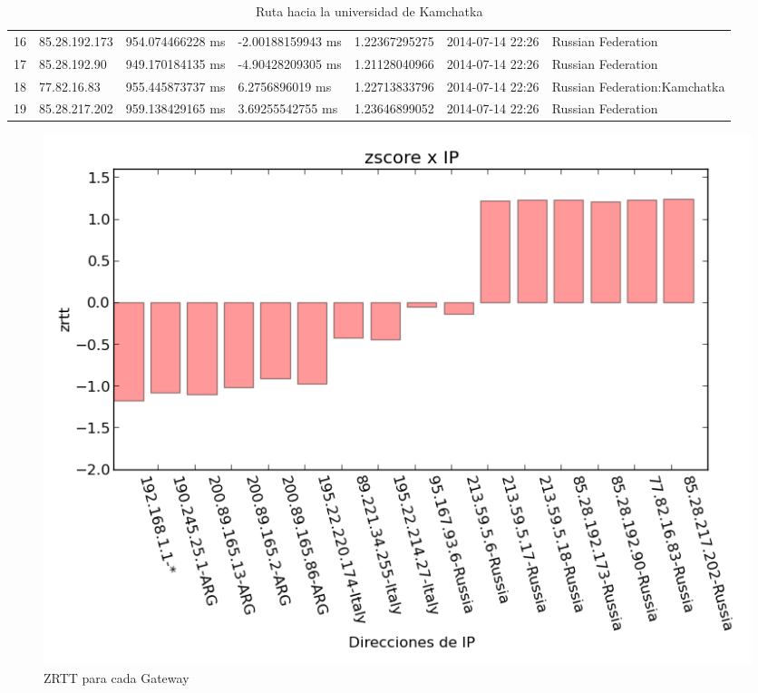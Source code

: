 \begin{table}[H]
{\begin{tabular}{lllllll}
16  & 85.28.192.173  & 954.074466228 ms & -2.00188159943 ms & 1.22367295275    & 2014-07-14 22:26 & Russian Federation           \\
17  & 85.28.192.90   & 949.170184135 ms & -4.90428209305 ms & 1.21128040966    & 2014-07-14 22:26 & Russian Federation           \\
18  & 77.82.16.83    & 955.445873737 ms & 6.2756896019 ms   & 1.22713833796    & 2014-07-14 22:26 & Russian Federation:Kamchatka \\
19  & 85.28.217.202  & 959.138429165 ms & 3.69255542755 ms  & 1.23646899052    & 2014-07-14 22:26 & Russian Federation          
\end{tabular}
}
\caption{Ruta hacia la universidad de Kamchatka}
\label{my-label}
\end{table}

\begin{figure}[H]
	\begin{center}
		  \includegraphics[scale=0.5]{../graficos_informe/kamgu_zscore.png}
		  \caption{ZRTT para cada Gateway}
		  \label{fig:contra1}
	\end{center}
\end{figure}


